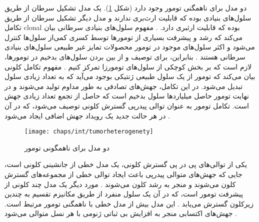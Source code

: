 دو مدل برای ناهمگنی تومور وجود دارد (شکل \ref{fig:ch_intr:tumorheterogenety}). یک مدل تشکیل سرطان از طریق سلول‌های بنیادی بوده که قابلیت ارث‌بری ندارند و مدل دیگر تشکیل سرطان از طریق تکامل \gls{clonal} بوده که قابلیت ارثبری دارد. \cite{birbrair2014type}. مفهوم سلول‌های بنیادی سرطانی بیان می‌کند که رشد و پیشرفت بسیاری از تومور‌ها توسط کسری کمی‌از سلول‌ها کنترل می‌شود و اکثر سلول‌های موجود در تومور محصولات تمایز غیر طبیعی سلول‌های بنیادی سرطانی هستند \cite{birbrair2014type}. بنابراین، برای توصیف و از بین بردن سلول‌های بدخیم در تومورها، لازم است که بر بخش کوچکی از سلول‌های تومورزا تمرکز کنیم \cite{handa2011redox}. مفهوم تکامل کلونی بیان می‌کند که تومور از یک سلول طبیعی ژنتیکی بوجود می‌آید که به تعداد زیادی سلول تبدیل می‌شود. در این تکامل، جهش‌های تصادفی به طور مداوم تولید می‌شوند و در نهایت تومور حاصل میلیارد‌ها سلول بدخیم است که حاصل از تجمع تعداد زیادی جهش است\cite{halford2005o6}. تکامل تومور به عنوان توالی پیدرپی گسترش کلونی توصیف می‌شود، که در آن در هر حالت جدید یک رویداد جهش اضافی ایجاد می‌شود \cite{birbrair2014type}. 

\begin{figure}[!ht]
	\centerline{\texttt{[image: chaps/int/tumorheterogenety]}}
	\caption{دو مدل برای ناهمگونی تومور}
	\label{fig:ch_intr:tumorheterogenety}
\end{figure}

یکی از توالی‌های پی در پی گسترش کلونی، یک مدل خطی از جانشینی کلونی است، جایی که جهش‌های متوالی پیدرپی باعث ایجاد توالی خطی از مجموعه‌های گسترش کلون می‌شوند و منجر به رشد کلون می‌شوند \cite{birbrair2014type}. مورد دیگر یک مدل چند کلونی از پیشرفت تومور است، که در آن یک سلول منفرد از طریق مکانیزم تقسیم به چندین زیرکلون گسترش می‌یابد \cite{lee2011promoter}. این مدل بیش از مدل خطی با ناهمگنی تومور مرتبط است. جهش‌های اکتسابی منجر به افزایش بی ثباتی ژنومی با هر نسل متوالی می‌شود \cite{cooper1992elements}. 

